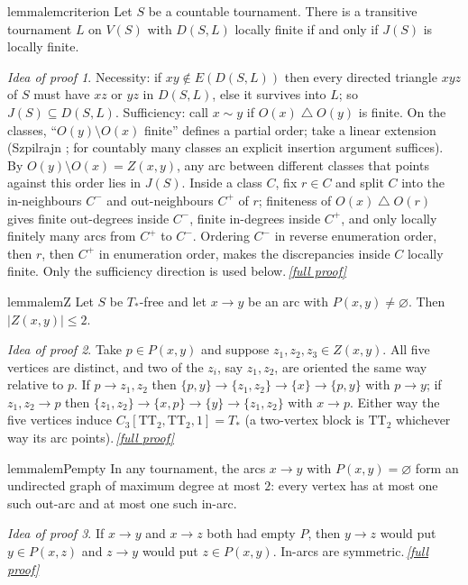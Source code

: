 \documentclass[11pt,a4paper]{article}
\theoremstyle{plain}
\theoremstyle{definition}
\theoremstyle{remark}
\newtheorem*{proofidea}{Idea of proof}
\newcommand{\fullproofref}[1]{\,\hyperref[#1]{\textit{[full proof]}}}
\newcommand{\Tstar}{T_{\ast}}
\newcommand{\TT}{\mathrm{TT}}
\newcommand{\symdiff}{\mathbin{\triangle}}
\begin{document}
\begin{restatable}{lemma}{lemcriterion}\label{lem:criterion}
Let $S$ be a countable tournament. There is a transitive tournament $L$ on $V(S)$ with $D(S,L)$ locally finite if and only if $J(S)$ is locally finite.
\end{restatable}
\begin{proofidea}
Necessity: if $xy\notin E(D(S,L))$ then every directed triangle $xyz$ of $S$ must have $xz$ or $yz$ in $D(S,L)$, else it survives into $L$; so $J(S)\subseteq D(S,L)$. Sufficiency: call $x\sim y$ if $O(x)\symdiff O(y)$ is finite. On the classes, ``$O(y)\setminus O(x)$ finite'' defines a partial order; take a linear extension (Szpilrajn \cite{Sz30}; for countably many classes an explicit insertion argument suffices). By $O(y)\setminus O(x)=Z(x,y)$, any arc between different classes that points against this order lies in $J(S)$. Inside a class $C$, fix $r\in C$ and split $C$ into the in-neighbours $C^-$ and out-neighbours $C^+$ of $r$; finiteness of $O(x)\symdiff O(r)$ gives finite out-degrees inside $C^-$, finite in-degrees inside $C^+$, and only locally finitely many arcs from $C^+$ to $C^-$. Ordering $C^-$ in reverse enumeration order, then $r$, then $C^+$ in enumeration order, makes the discrepancies inside $C$ locally finite. Only the sufficiency direction is used below.\fullproofref{pf:criterion}
\end{proofidea}

\begin{restatable}{lemma}{lemZ}\label{lem:Z}
Let $S$ be $\Tstar$-free and let $x\to y$ be an arc with $P(x,y)\ne\varnothing$. Then $|Z(x,y)|\le 2$.
\end{restatable}
\begin{proofidea}
Take $p\in P(x,y)$ and suppose $z_1,z_2,z_3\in Z(x,y)$. All five vertices are distinct, and two of the $z_i$, say $z_1,z_2$, are oriented the same way relative to $p$. If $p\to z_1,z_2$ then $\{p,y\}\to\{z_1,z_2\}\to\{x\}\to\{p,y\}$ with $p\to y$; if $z_1,z_2\to p$ then $\{z_1,z_2\}\to\{x,p\}\to\{y\}\to\{z_1,z_2\}$ with $x\to p$. Either way the five vertices induce $C_3[\TT_2,\TT_2,1]=\Tstar$ (a two-vertex block is $\TT_2$ whichever way its arc points).\fullproofref{pf:Z}
\end{proofidea}

\begin{restatable}{lemma}{lemPempty}\label{lem:Pempty}
In any tournament, the arcs $x\to y$ with $P(x,y)=\varnothing$ form an undirected graph of maximum degree at most $2$: every vertex has at most one such out-arc and at most one such in-arc.
\end{restatable}
\begin{proofidea}
If $x\to y$ and $x\to z$ both had empty $P$, then $y\to z$ would put $y\in P(x,z)$ and $z\to y$ would put $z\in P(x,y)$. In-arcs are symmetric.\fullproofref{pf:Pempty}
\end{proofidea}
\end{document}
